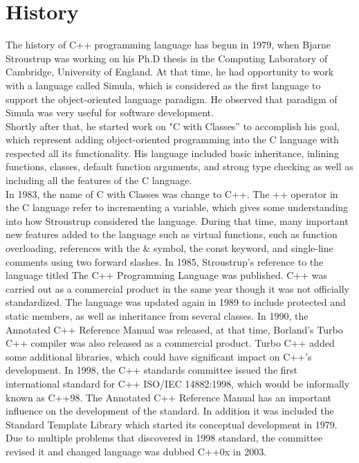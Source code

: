 \documentclass[12pt,a4paper]{report}
\begin{document}
\section{History}
\label{section: History}
The history of C++ programming language has begun in 1979, when Bjarne Stroustrup was working on his Ph.D thesis in the Computing Laboratory of Cambridge, University of England. At that time, he had opportunity to work with a language called Simula, which is considered as the first language to support the object-oriented language paradigm. He observed that paradigm of Simula was very useful for software development\cite{Stroustrup:1996:HC:234286.1057836}.\\
Shortly after that, he started work on "C with Classes” to accomplish his goal, which represent adding object-oriented programming into the C language with respected all its functionality. His language included basic inheritance, inlining functions, classes, default function arguments, and strong type checking as well as including all the features of the C language\cite{Stroustrup:1996:HC:234286.1057836}.\\
In 1983, the name of C with Classes was change to C++. The ++ operator in the C language refer to incrementing a variable, which gives some understanding into how Stroustrup considered the language. During that time, many important new features added to the language such as  virtual functions, such as function overloading, references with the \& symbol, the const keyword, and single-line comments using two forward slashes\cite{Stroustrup:1996:HC:234286.1057836}.\newline
In 1985, Stroustrup's reference to the language titled The C++ Programming Language was published. C++ was carried out as a commercial product in the same year though it was not officially standardized. The language was updated again in 1989 to include protected and static members, as well as inheritance from several classes\cite{Stroustrup:1996:HC:234286.1057836}.
\newline
In 1990, the Annotated C++ Reference Manual was released, at that time, Borland's Turbo C++ compiler was also released as a commercial product. Turbo C++ added some additional libraries, which could have significant impact on C++'s development\cite{Stroustrup:1996:HC:234286.1057836}.
\newline
In 1998, the C++ standards committee issued the first international standard for C++ ISO/IEC 14882:1998, which would be informally known as C++98. The Annotated C++ Reference Manual has an important influence on the development of the standard.  In addition it was included the Standard Template Library which started its conceptual development in 1979. Due to multiple problems that discovered in 1998 standard, the committee revised it and changed language was dubbed C++0x in 2003\cite{CplusplusHistoryofCpp}.
\end{document}
